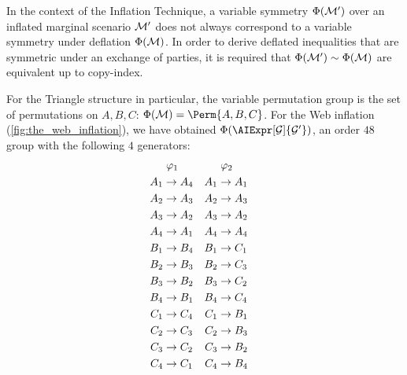 \documentclass[aps, 10pt, english, twoside, pra, nofootinbib, tightenlines, longbibliography, superscriptaddress]{revtex4-1}
\begin{document}
    In the context of the Inflation Technique, a variable symmetry $\Phi\br{\mscenario'}$ over an inflated marginal scenario $\mathcal{M}'$ does not always correspond to a variable symmetry under deflation $\Phi\br{\mscenario}$. In order to derive deflated inequalities that are symmetric under an exchange of parties, it is required that $\Phi\br{\mscenario'} \sim \Phi\br{\mscenario}$ are equivalent up to copy-index.

    For the Triangle structure in particular, the variable permutation group is the set of permutations on $A, B, C$: $\Phi\br{\mscenario} = \Perm{A, B, C}$. For the Web inflation (\cref{fig:the_web_inflation}), we have obtained $\gp\br{\AIExpr[\graph]{\graph'}}$, an order $48$ group with the following $4$ generators:
    \begin{equation}
    \begin{aligned}[c]
    &\hspace{1mm}\varphi_1 \\
    A_1 &\to A_4 \\A_2 &\to A_3 \\A_3 &\to A_2 \\A_4 &\to A_1 \\B_1 &\to B_4 \\B_2 &\to B_3 \\B_3 &\to B_2 \\B_4 &\to B_1 \\C_1 &\to C_4 \\C_2 &\to C_3 \\C_3 &\to C_2 \\C_4 &\to C_1
    \end{aligned}
    \quad
    \begin{aligned}[c]
    &\hspace{1mm}\varphi_2 \\
    A_1 &\to A_1 \\A_2 &\to A_3 \\A_3 &\to A_2 \\A_4 &\to A_4 \\B_1 &\to C_1 \\B_2 &\to C_3 \\B_3 &\to C_2 \\B_4 &\to C_4 \\C_1 &\to B_1 \\C_2 &\to B_3 \\C_3 &\to B_2 \\C_4 &\to B_4
    \end{aligned}
    \quad
    \begin{aligned}[c]

\end{aligned}
\end{equation}
\end{document}
